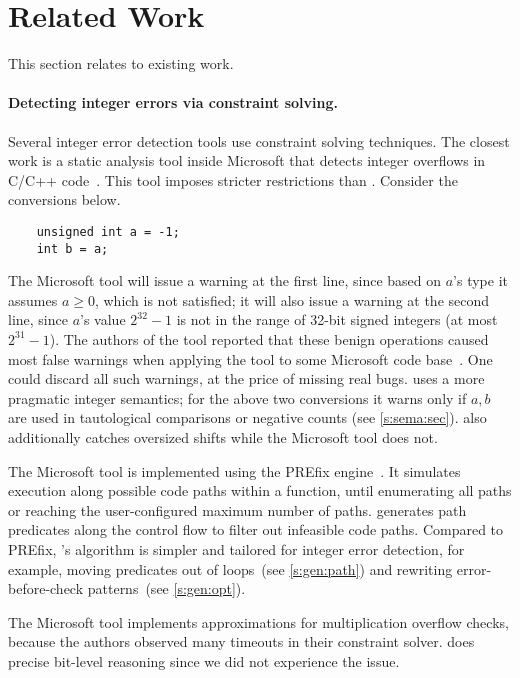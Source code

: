 \section{Related Work}
\label{s:relwk}

This section relates \sys to existing work.

\paragraph{Detecting integer errors via constraint solving.}

Several integer error detection tools use constraint solving
techniques.  The closest work is a static analysis tool inside
Microsoft that detects integer overflows in C/C++ code~\cite{moy:z3prefix}.
This tool imposes stricter restrictions than \sys.
Consider the conversions below.
\begin{Verbatim}
	unsigned int a = -1;
	int b = a;
\end{Verbatim}
The Microsoft tool will issue a warning at the first line,
since based on $a$'s type it assumes $a \geq 0$, which is not satisfied;
it will also issue a warning at the second line,
since $a$'s value $2^{32} - 1$ is not in the range of 32-bit signed integers
(at most $2^{31} - 1$).
The authors of the tool reported that these benign operations caused
most false warnings when applying the tool to some Microsoft code
base~\cite[\subsectionautorefname~6.2]{moy:z3prefix}.
One could discard all such warnings, at the price of
missing real bugs.
\sys uses a more pragmatic integer semantics;
for the above two conversions it warns only if $a, b$ are used in
tautological comparisons or negative counts (see \autoref{s:sema:sec}).
\sys also additionally catches oversized shifts while the Microsoft tool does not.

The Microsoft tool is implemented using the PREfix
engine~\cite{bush:prefix}.  It simulates execution along possible
code paths within a function, until enumerating all paths or reaching
the user-configured maximum number of paths.
%
\sys generates path predicates along the control flow
to filter out infeasible code paths.
Compared to PREfix, \sys's algorithm is simpler
and tailored for integer error detection, for example, moving
predicates out of loops~(see \autoref{s:gen:path}) and rewriting
error-before-check patterns~(see \autoref{s:gen:opt}).

The Microsoft tool implements approximations for multiplication
overflow checks, because the authors observed many timeouts in their
constraint solver.  \sys does precise bit-level reasoning
since we did not experience the issue.

